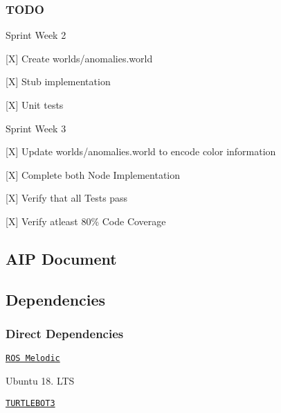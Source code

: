 \subsubsection*{T\+O\+DO}


\begin{DoxyItemize}
\item Sprint Week 2
\begin{DoxyItemize}
\item \mbox{[}X\mbox{]} Create worlds/anomalies.\+world
\item \mbox{[}X\mbox{]} Stub implementation
\item \mbox{[}X\mbox{]} Unit tests
\end{DoxyItemize}
\item Sprint Week 3
\begin{DoxyItemize}
\item \mbox{[}X\mbox{]} Update worlds/anomalies.\+world to encode color information
\item \mbox{[}X\mbox{]} Complete both Node Implementation
\item \mbox{[}X\mbox{]} Verify that all Tests pass
\item \mbox{[}X\mbox{]} Verify atleast 80\% Code Coverage
\end{DoxyItemize}
\end{DoxyItemize}

\subsection*{A\+IP Document}

\href{https://docs.google.com/spreadsheets/d/1gK6UU1C03G-Nt6Inuk5zHCRxUzo2bpcLRpkTf8MvC3I/edit?usp=sharing}{\tt } \href{https://docs.google.com/document/d/1NFZc3CICtRCiKvu_DC-juLE--KWvMurhhtYTClnU67w/edit?usp=sharing}{\tt }

\subsection*{Dependencies}

\subsubsection*{Direct Dependencies}


\begin{DoxyEnumerate}
\item \href{http://wiki.ros.org/melodic/Installation/Ubuntu}{\tt R\+OS Melodic}
\item Ubuntu 18. L\+TS
\item \href{https://answers.ros.org/question/293514/turtlebot-installation-on-ros-melodic/}{\tt T\+U\+R\+T\+L\+E\+B\+O\+T3}
\end{DoxyEnumerate}

